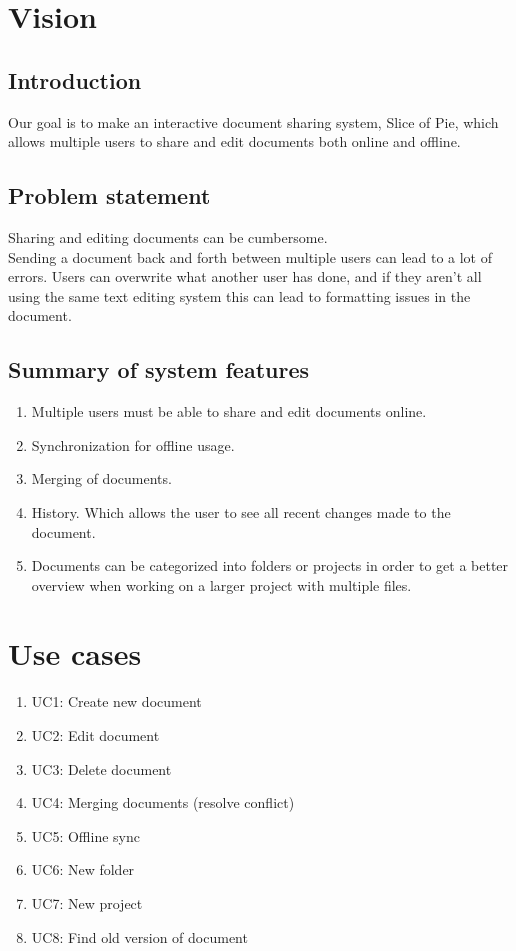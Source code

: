 \documentclass[11pt,a4paper]{article}
\begin{document}
\tableofcontents
\newpage

\section{Vision}
\subsection{Introduction}
Our goal is to make an interactive document sharing system, Slice of Pie,  which allows multiple users to share and edit documents both online and offline.
\subsection{Problem statement}
Sharing and editing documents can be cumbersome. \\
Sending a document back and forth between multiple users can lead to a lot of errors. Users can overwrite what another user has done, and if they aren't all using the same text editing system this can lead to formatting issues in the document.
\subsection{Summary of system features}
\begin{enumerate}
\item Multiple users must be able to share and edit documents online.
\item Synchronization for offline usage.
\item Merging of documents.
\item History. Which allows the user to see all recent changes made to the document.
\item Documents can be categorized into folders or projects in order to get a better overview when working on a larger project with multiple files.
\end{enumerate}

\section{Use cases}
\begin{enumerate}
\item UC1: Create new document
\item UC2: Edit document
\item UC3: Delete document
\item UC4: Merging documents (resolve conflict)
\item UC5: Offline sync
\item UC6: New folder
\item UC7: New project
\item UC8: Find old version of document
\end{enumerate}
\end{document}
